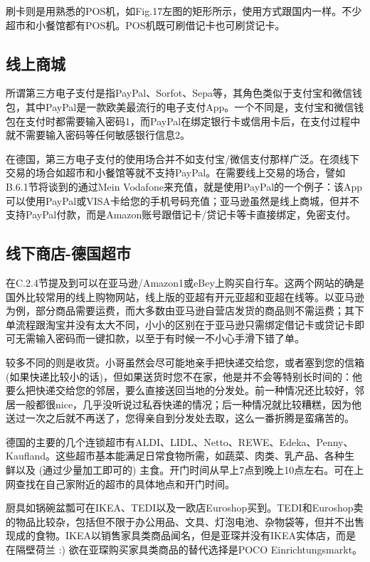     刷卡则是用熟悉的POS机，如Fig.17左图的矩形所示，使用方式跟国内一样。不少超市和小餐馆都有POS机。POS机既可刷借记卡也可刷贷记卡。

  \subsection{线上商城}

    所谓第三方电子支付是指PayPal、Sorfot、Sepa等，其角色类似于支付宝和微信钱包，其中PayPal是一款欧美最流行的电子支付App。一个不同是，支付宝和微信钱包在支付时都需要输入密码1，而PayPal在绑定银行卡或信用卡后，在支付过程中就不需要输入密码等任何敏感银行信息2。

    在德国，第三方电子支付的使用场合并不如支付宝/微信支付那样广泛。在须线下交易的场合如超市和小餐馆等就不支持PayPal。在需要线上交易的场合，譬如B.6.1节将谈到的通过Mein Vodafone来充值，就是使用PayPal的一个例子：该App可以使用PayPal或VISA卡给您的手机号码充值；亚马逊虽然是线上商城，但并不支持PayPal付款，而是Amazon账号跟借记卡/贷记卡等卡直接绑定，免密支付。

  \subsection{线下商店-德国超市}

    在C.2.4节提及到可以在亚马逊/Amazon1或eBey上购买自行车。这两个网站的确是国外比较常用的线上购物网站，线上版的亚超有开元亚超和亚超在线等。以亚马逊为例，部分商品需要运费，而大多数由亚马逊自营店发货的商品则不需运费；其下单流程跟淘宝并没有太大不同，小小的区别在于亚马逊只需绑定借记卡或贷记卡即可无需输入密码而一键扣款，以至于有时候一不小心手滑下错了单。

    较多不同的则是收货。小哥虽然会尽可能地亲手把快递交给您，或者塞到您的信箱 (如果快递比较小的话)，但如果送货时您不在家，他是并不会等特别长时间的：他要么把快递交给您的邻居，要么直接送回当地的分发处。前一种情况还比较好，邻居一般都很nice，几乎没听说过私吞快递的情况；后一种情况就比较糟糕，因为他送过一次之后就不再送了，您得亲自到分发处去取，这么一番折腾是蛮痛苦的。

    德国的主要的几个连锁超市有ALDI、LIDL、Netto、REWE、Edeka、Penny、Kaufland。这些超市基本能满足日常食物所需，如蔬菜、肉类、乳产品、各种生鲜以及 (通过少量加工即可的) 主食。开门时间从早上7点到晚上10点左右。可在上网查找在自己家附近的超市的具体地点和开门时间。

    厨具如锅碗盆瓢可在IKEA、TEDI以及一欧店Euroshop买到。TEDI和Euroshop卖的物品比较杂，包括但不限于办公用品、文具、灯泡电池、杂物袋等，但并不出售现成的食物。IKEA以销售家具类商品闻名，但是亚琛并没有IKEA实体店，而是在隔壁荷兰 :) 欲在亚琛购买家具类商品的替代选择是POCO Einrichtungsmarkt。

